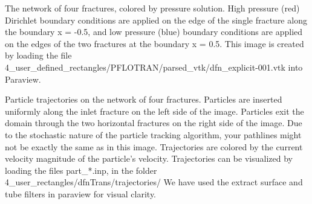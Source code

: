 \documentclass[letterpaper,10pt,english]{sphinxmanual}
\begin{document}
{\hfill{}\hfill}

The network of four fractures,  colored by pressure solution.
High pressure (red) Dirichlet boundary conditions are applied on the edge of the single fracture along the boundary x = -0.5, and low pressure (blue) boundary conditions are applied on the edges of the two fractures at the boundary x = 0.5.
This image is created by loading the file 4\_user\_defined\_rectangles/PFLOTRAN/parsed\_vtk/dfn\_explicit-001.vtk into Paraview.

{\hfill{}\hfill}

Particle trajectories on the network of four fractures.
Particles are inserted uniformly along the inlet fracture on the left side of the image.
Particles exit the domain through the two horizontal fractures on the right side of the image.
Due to the stochastic nature of the particle tracking algorithm, your pathlines might not be exactly the same as in this image.
Trajectories are colored by the current velocity magnitude of the particle's velocity.
Trajectories can be visualized by loading the files part\_*.inp, in the folder 4\_user\_rectangles/dfnTrans/trajectories/
We have used the extract surface and tube filters in paraview for visual clarity.

{\hfill{}\hfill}
\end{document}
